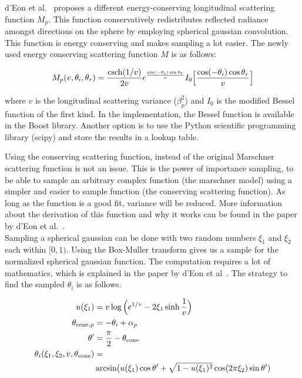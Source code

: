 \documentclass[11pt,a4paper]{report}
\begin{document}
d'Eon et al.~\cite{eon2011} proposes a different energy-conserving longitudinal scattering function $M_p$. This function conservatively redistributes reflected radiance amongst directions on the sphere by employing spherical gaussian convolution. This function is energy conserving and makes sampling a lot easier. The newly used energy conserving scattering function $M$ is as follows:

\begin{equation}
M_p(v, \theta_i, \theta_r) = \frac{\textnormal{csch}(1/v)}{2v} e^{\frac{\sin(-\theta_i)\sin\theta_r}{v}} I_0 \Big [ \frac{\cos(-\theta_i) \cos \theta_r}{v} \Big ]
\end{equation}

where $v$ is the longitudinal scattering variance ($\beta_p^2$) and $I_0$ is the modified Bessel function of the first kind. In the implementation, the Bessel function is available in the Boost library. Another option is to use the Python scientific programming library (scipy) and store the results in a lookup table.

Using the conserving scattering function, instead of the original Marschner scattering function is not an issue. This is the power of importance sampling, to be able to sample an arbitrary complex function (the marschner model) using a simpler and easier to sample function (the conserving scattering function). As long as the function is a good fit, variance will be reduced. More information about the derivation of this function and why it works can be found in the paper by d'Eon et al.~\cite{eon2011}.\\

Sampling a spherical gaussian can be done with two random numbers $\xi_1$ and $\xi_2$ each within $[0, 1)$. Using the Box-Muller transform gives us a sample for the normalized spherical gaussian function. The computation requires a lot of mathematics, which is explained in the paper by d'Eon et al~\cite{eon2013}. The strategy to find the sampled $\theta_i$ is as follows.

\begin{align}
u(\xi_1) &= v \log \Big (e^{1/v} - 2\xi_1 \sinh \frac{1}{v} \Big ) \\
\theta_{\textnormal{cone}, p} &= -\theta_i + \alpha_p\\
\theta' &= \frac{\pi}{2} - \theta_{\textnormal{cone}} \\
\theta_i(\xi_1, \xi_2, v, \theta_{\textnormal{cone}}) &= \nonumber \\
& \arcsin(u(\xi_1) \cos \theta' + \sqrt{1 - u(\xi_1)^2} \cos(2\pi \xi_2) \sin \theta')
\end{align}
\end{document}

